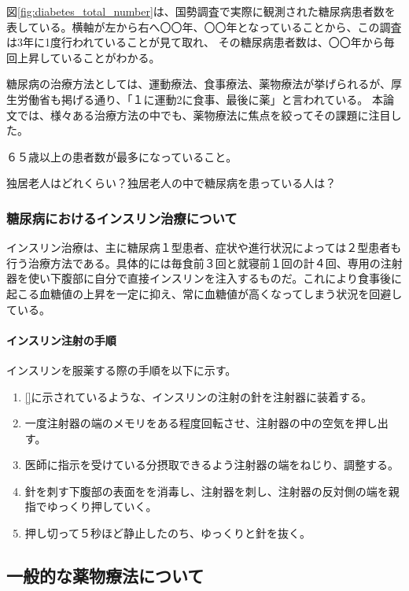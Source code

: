 図\ref{fig:diabetes_total_number}は、国勢調査で実際に観測された糖尿病患者数を表している。横軸が左から右へ〇〇年、〇〇年となっていることから、この調査は3年に1度行われていることが見て取れ、
その糖尿病患者数は、〇〇年から毎回上昇していることがわかる。

糖尿病の治療方法としては、運動療法、食事療法、薬物療法が挙げられるが、厚生労働省も掲げる通り、「１に運動2に食事、最後に薬」と言われている。
本論文では、様々ある治療方法の中でも、薬物療法に焦点を絞ってその課題に注目した。

６５歳以上の患者数が最多になっていること。

独居老人はどれくらい？独居老人の中で糖尿病を患っている人は？

\subsubsection{糖尿病におけるインスリン治療について}
\label{subsubsection:insulin_treatment}

インスリン治療は、主に糖尿病１型患者、症状や進行状況によっては２型患者も行う治療方法である。具体的には毎食前３回と就寝前１回の計４回、専用の注射器を使い下腹部に自分で直接インスリンを注入するものだ。これにより食事後に起こる血糖値の上昇を一定に抑え、常に血糖値が高くなってしまう状況を回避している。

\paragraph{インスリン注射の手順}
\label{paragraph:insulin_injection_steps}
インスリンを服薬する際の手順を以下に示す。

\begin{enumerate}
  \item \ref{}に示されているような、インスリンの注射の針を注射器に装着する。
  \item 一度注射器の端のメモリをある程度回転させ、注射器の中の空気を押し出す。
  \item 医師に指示を受けている分摂取できるよう注射器の端をねじり、調整する。
  \item 針を刺す下腹部の表面をを消毒し、注射器を刺し、注射器の反対側の端を親指でゆっくり押していく。
  \item 押し切って５秒ほど静止したのち、ゆっくりと針を抜く。
\end{enumerate}


\subsection{一般的な薬物療法について}
\label{subsection:drug_treatment}

